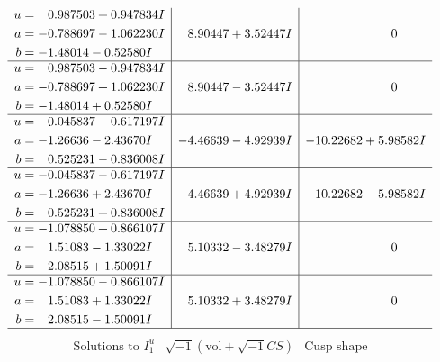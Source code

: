 \documentclass[1p]{elsarticle_modified}
\theoremstyle{definition}
\newcommand{\I}{\sqrt{-1}}
\begin{document}
$$\begin{array}{c|c|c}
\begin{aligned}
u &= \phantom{-}0.987503 + 0.947834 I \\
a &= -0.788697 - 1.062230 I \\
b &= -1.48014 - 0.52580 I\end{aligned}
 & \phantom{-}8.90447 + 3.52447 I & \phantom{-0.000000 } 0 \\ \hline\begin{aligned}
u &= \phantom{-}0.987503 - 0.947834 I \\
a &= -0.788697 + 1.062230 I \\
b &= -1.48014 + 0.52580 I\end{aligned}
 & \phantom{-}8.90447 - 3.52447 I & \phantom{-0.000000 } 0 \\ \hline\begin{aligned}
u &= -0.045837 + 0.617197 I \\
a &= -1.26636 - 2.43670 I \\
b &= \phantom{-}0.525231 - 0.836008 I\end{aligned}
 & -4.46639 - 4.92939 I & -10.22682 + 5.98582 I \\ \hline\begin{aligned}
u &= -0.045837 - 0.617197 I \\
a &= -1.26636 + 2.43670 I \\
b &= \phantom{-}0.525231 + 0.836008 I\end{aligned}
 & -4.46639 + 4.92939 I & -10.22682 - 5.98582 I \\ \hline\begin{aligned}
u &= -1.078850 + 0.866107 I \\
a &= \phantom{-}1.51083 - 1.33022 I \\
b &= \phantom{-}2.08515 + 1.50091 I\end{aligned}
 & \phantom{-}5.10332 - 3.48279 I & \phantom{-0.000000 } 0 \\ \hline\begin{aligned}
u &= -1.078850 - 0.866107 I \\
a &= \phantom{-}1.51083 + 1.33022 I \\
b &= \phantom{-}2.08515 - 1.50091 I\end{aligned}
 & \phantom{-}5.10332 + 3.48279 I & \phantom{-0.000000 } 0\\
 \hline 
 \end{array}$$\newpage$$\begin{array}{c|c|c}  
\text{Solutions to }I^u_{1}& \I (\text{vol} + \sqrt{-1}CS) & \text{Cusp shape}\\
 \hline 
\begin{aligned}

\end{aligned}
\end{array}$$
\end{document}
